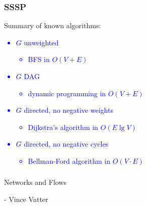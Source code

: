   \begin{frame}[fragile]
  \frametitle{SSSP}
  Summary of known algorithms: 
\textcolor{blue}  {
  \begin{itemize} 
  \item $G$ unweighted
    \begin{itemize} 
    \item BFS in $O(V+E)$
    \end{itemize} 
  \item $G$ DAG
    \begin{itemize} 
    \item   dynamic programming in $O(V+E)$
    \end{itemize} 
    \item $G$ directed, no negative weights
      \begin{itemize} 
      \item Dijkstra's algorithm in $O(E \lg V)$
      \end{itemize} 
    \item $G$ directed, no negative cycles
      \begin{itemize} 
        \item Bellman-Ford algorithm in $O(V\cdot E)$
        \end{itemize}
    \end{itemize} 
} 
\end{frame}

   \begin{frame}[fragile]\frametitle{}
\begin{center}
{\Large Networks and Flows}

 - Vince Vatter

\end{center}
\end{frame}


